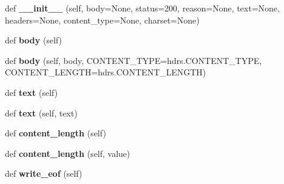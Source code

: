 \begin{DoxyCompactItemize}
\item 
\mbox{\label{classaiohttp_1_1web__response_1_1_response_a7343e7260ec02c61e98e54f77e74b1fe}} 
def {\bfseries \+\_\+\+\_\+init\+\_\+\+\_\+} (self, body=None, status=200, reason=None, text=None, headers=None, content\+\_\+type=None, charset=None)
\item 
\mbox{\label{classaiohttp_1_1web__response_1_1_response_a55b662864b1362024f3877d7cce87f6d}} 
def {\bfseries body} (self)
\item 
\mbox{\label{classaiohttp_1_1web__response_1_1_response_aadbc3ca8008db244ec9281d2ac90a132}} 
def {\bfseries body} (self, body, C\+O\+N\+T\+E\+N\+T\+\_\+\+T\+Y\+PE=hdrs.\+C\+O\+N\+T\+E\+N\+T\+\_\+\+T\+Y\+PE, C\+O\+N\+T\+E\+N\+T\+\_\+\+L\+E\+N\+G\+TH=hdrs.\+C\+O\+N\+T\+E\+N\+T\+\_\+\+L\+E\+N\+G\+TH)
\item 
\mbox{\label{classaiohttp_1_1web__response_1_1_response_ad0653f15c8badbc23b5bad8d31a96a6e}} 
def {\bfseries text} (self)
\item 
\mbox{\label{classaiohttp_1_1web__response_1_1_response_ac2eae705d20bf17e2522dc9be32372d5}} 
def {\bfseries text} (self, text)
\item 
\mbox{\label{classaiohttp_1_1web__response_1_1_response_ad9045dca5eeebc6858df1cff42e496ea}} 
def {\bfseries content\+\_\+length} (self)
\item 
\mbox{\label{classaiohttp_1_1web__response_1_1_response_a562258de65871bd7b5f665975b2ee902}} 
def {\bfseries content\+\_\+length} (self, value)
\item 
\mbox{\label{classaiohttp_1_1web__response_1_1_response_a2c4daf5c0e75c79d68779e963bf7eb23}} 
def {\bfseries write\+\_\+eof} (self)
\end{DoxyCompactItemize}
